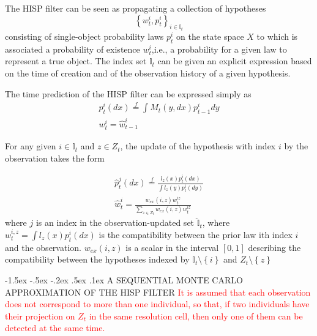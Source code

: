 \documentclass[a4paper, 11pt]{article}
\makeatletter
\newcommand{\sihao}{\fontsize{14pt}{\baselineskip}\selectfont}
\renewcommand\section{\@startsection{section}{1}{\z@}%
{-1.5ex \@plus -.5ex \@minus -.2ex}%
{.5ex \@plus .1ex}%
{\normalfont\sihao\CJKfamily{hei}}}
\makeatother
\begin{document}
\begin{CJK}{UTF8}{gbsn}
The HISP filter can be seen as propagating a collection of hypotheses
\begin{equation}
\left\{w_t^i,p_t^i \right\}_{i \in \mathbb{I}_t}
\end{equation}
consisting of single-object probability laws $p_t^i$ on the state space $X$ to which is associated a probability of existence $w_t^i$,i.e., a probability for a given law to represent a true object. The index set $\mathbb{I}_t$ can be given an explicit expression based on the  time of creation and of the observation history of a given hypothesis.

The time prediction of the HISP filter can be expressed simply as
\begin{equation}
\begin{aligned}
p_t^i(dx)\overset{f}{=} \int M_t(y,dx)p_{t-1}^i dy\\
w_t^i = \hat{w}_{t-1}^i
\end{aligned}
\end{equation}

For any given $i \in \mathbb{I}_t$ and $z \in Z_t$, the update of the hypothesis with index $i$ by the observation takes the form

\begin{equation}
\begin{aligned}
\hat{p}_t^j(dx) \overset{f}{=}  \frac{l_z(x)p_t^i(dx)}{\int l_z(y)p_t^i(dy)}\\
\hat{w}_t^i =  \frac{w_{ex}(i,z)w_t^{iz}}{\sum_{z \in Z_t} w_{ex}(i,z)w_t^{iz}}
\end{aligned}
\end{equation}
where $j$ is an index in the observation-updated set $\hat{\mathbb{I}}_t$, where $w_t^{i,z} = \int l_z(x)p_t^i(dx)$ is the compatibility between the prior law ith index $i$ and the observation. $w_{ex}(i,z)$ is a scalar in the interval $[0,1]$ describing the compatibility between the hypotheses indexed by $\mathbb{I}_t \setminus \left\{i\right\}$ and $Z_t \setminus \left\{ z\right\}$

\section{A SEQUENTIAL MONTE CARLO APPROXIMATION OF THE HISP FILTER}
\textcolor{red}{It is assumed that each observation does not correspond to more than one individual, so that, if two individuals have their projection on $Z_t$ in the same resolution cell, then only one of them can be detected at the same time.}


\end{CJK}
\end{document}
